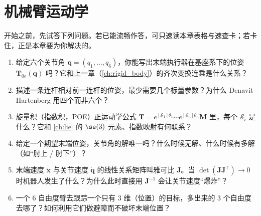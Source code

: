 \chapter{机械臂运动学}
\label{ch:arm-kin}


\begin{practice}[前置自测]
开始之前，先试答下列问题。若已能流畅作答，可只速读本章表格与速查卡；若卡住，正是本章要为你解决的。
\begin{enumerate}
  \item 给定六个关节角 $\mathbf{q}=(q_1,\dots,q_6)$，你能写出末端执行器在基座系下的位姿 $\mathbf{T}_{0e}(\mathbf{q})$ 吗？它和上一章（\cref{ch:rigid_body}）的齐次变换连乘是什么关系？
  \item 描述一条连杆相对前一连杆的位姿，最少需要几个标量参数？为什么 Denavit--Hartenberg 用四个而非六个？
  \item 旋量积（指数积，POE）正运动学公式 $\mathbf{T}=e^{[\mathcal{S}_1]\theta_1}\cdots e^{[\mathcal{S}_n]\theta_n}\mathbf{M}$ 里，每个 $\mathcal{S}_i$ 是什么？它和 \cref{ch:lie} 的 $\se(3)$ 元素、指数映射有何联系？
  \item 给定一个期望末端位姿，关节角的解唯一吗？什么时候无解、什么时候有多解（如“肘上 / 肘下”）？
  \item 末端速度 $\dot{\mathbf{x}}$ 与关节速度 $\dot{\mathbf{q}}$ 的线性关系矩阵叫雅可比 $\mathbf{J}$。当 $\det(\mathbf{J}\mathbf{J}^\top)\to0$ 时机器人发生了什么？为什么此时直接用 $\mathbf{J}^{-1}$ 会让关节速度“爆炸”？
  \item 一个 6 自由度臂去跟踪一个只有 3 维（位置）的目标，多出来的 3 个自由度去哪了？如何利用它们做避障而不破坏末端位置？
\end{enumerate}
\end{practice}

